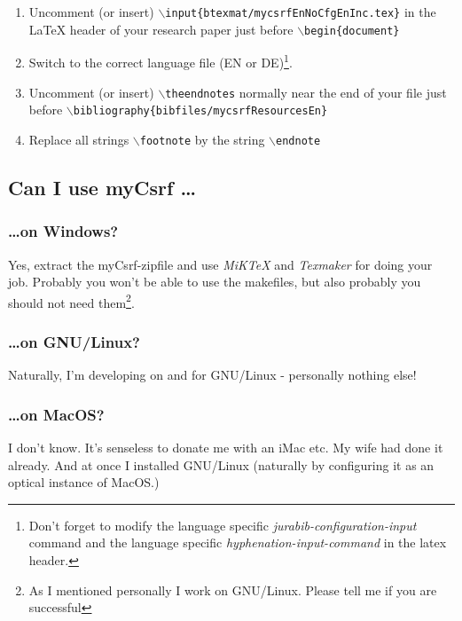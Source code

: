\documentclass[DIV=calc,BCOR=5mm,11pt,headings=small,oneside,abstract=true, toc=bib]{scrartcl}
\begin{document}
\begin{enumerate}
  \item Uncomment (or insert) 
  \texttt{$\backslash$input\{btexmat/mycsrfEnNoCfgEnInc.tex\}} in the LaTeX header of
  your research paper just before \texttt{$\backslash$begin\{document\}}
  \item Switch to the correct language file (EN or DE)\footnote{Don't forget to
  modify the language specific \textit{jurabib-configuration-input} command and the language
  specific \textit{hyphenation-input-command} in the latex header.}.
  \item Uncomment (or insert) \texttt{$\backslash$theendnotes}
  normally near the end of your file just before
  \texttt{$\backslash$bibliography\{bibfiles/mycsrfResourcesEn\}}
  \item Replace all strings \texttt{$\backslash$footnote} by the string
  \texttt{$\backslash$endnote}
\end{enumerate}



\subsection{Can I use myCsrf \ldots}
\subsubsection{\ldots on Windows?}
Yes, extract the myCsrf-zipfile and use \textit{MiKTeX} and
\textit{Texmaker} for doing your job. Probably you won't be able to use the
makefiles, but also probably you should not need them\footnote{As I mentioned
personally I work on GNU/Linux. Please tell me if you are successful}.

\subsubsection{\ldots on GNU/Linux?}
Naturally, I'm developing on and for GNU/Linux - personally nothing else!

\subsubsection{\ldots on MacOS?}
I don't know. It's senseless to donate me with an iMac etc. My wife had done it
already. And at once I installed GNU/Linux (naturally by configuring it as an
optical instance of MacOS.)
\end{document}
